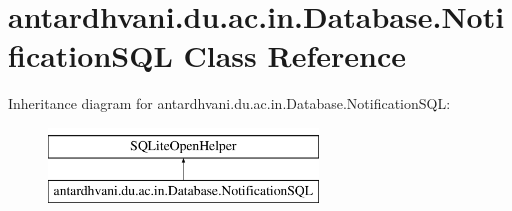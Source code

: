\hypertarget{classantardhvani_1_1du_1_1ac_1_1in_1_1_database_1_1_notification_s_q_l}{}\section{antardhvani.\+du.\+ac.\+in.\+Database.\+Notification\+S\+Q\+L Class Reference}
\label{classantardhvani_1_1du_1_1ac_1_1in_1_1_database_1_1_notification_s_q_l}
Inheritance diagram for antardhvani.\+du.\+ac.\+in.\+Database.\+Notification\+S\+Q\+L\+:\begin{figure}[H]
\begin{center}
\leavevmode
\includegraphics[height=2.000000cm]{classantardhvani_1_1du_1_1ac_1_1in_1_1_database_1_1_notification_s_q_l}
\end{center}
\end{figure}
